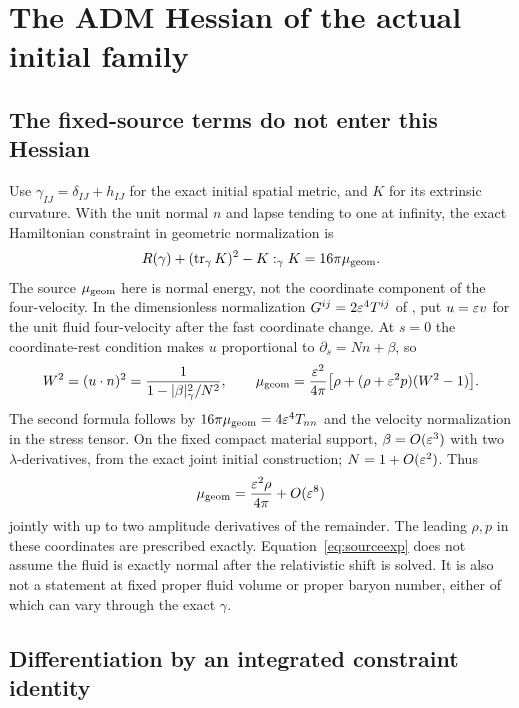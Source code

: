 \section{The ADM Hessian of the actual initial family}\label{sec:adm}

\subsection{The fixed-source terms do not enter this Hessian}

Use \(\gamma_{IJ}=\delta_{IJ}+h_{IJ}\) for the exact initial spatial metric, and \(K\) for its extrinsic curvature. With the unit normal \(n\) and lapse tending to one at infinity, the exact Hamiltonian constraint in geometric normalization is
\begin{equation}
          R(\gamma)+(\operatorname{tr}_\gamma K)^2-K:_{\gamma} K=16\pi\mu_{\rm geom}.
          \label{eq:HC}
\end{equation}
The source \(\mu_{\rm geom}\) here is normal energy, not the coordinate component of the four-velocity. In the dimensionless normalization \(G^{ij}=2\varepsilon^4 T^{ij}\) of \cite[Eq.~(1)]{Oliynyk}, put \(u=\varepsilon v\) for the unit fluid four-velocity after the fast coordinate change. At \(s=0\) the coordinate-rest condition makes \(u\) proportional to \(\partial_s=Nn+\beta\), so
\[
        W^2=(u\cdot n)^2=\frac{1}{1-|\beta|_\gamma^2/N^2},\qquad
        \mu_{\rm geom}
          =\frac{\varepsilon^2}{4\pi}
                \bigl[\rho+(\rho+\varepsilon^2p)(W^2-1)\bigr].
\]
The second formula follows by \(16\pi\mu_{\rm geom}=4\varepsilon^4 T_{nn}\) and the velocity normalization in the stress tensor. On the fixed compact material support, \(\beta=O(\varepsilon^3)\) with two \(\lambda\)-derivatives, from the exact joint initial construction; \(N=1+O(\varepsilon^2)\). Thus
\begin{equation}
           \mu_{\rm geom}=\frac{\varepsilon^2\rho}{4\pi}+O(\varepsilon^8)
           \label{eq:sourceexp}
\end{equation}
jointly with up to two amplitude derivatives of the remainder. The leading \(\rho,p\) in these coordinates are prescribed exactly. Equation~\eqref{eq:sourceexp} does not assume the fluid is exactly normal after the relativistic shift is solved. It is also not a statement at fixed proper fluid volume or proper baryon number, either of which can vary through the exact \(\gamma\).

\subsection{Differentiation by an integrated constraint identity}

